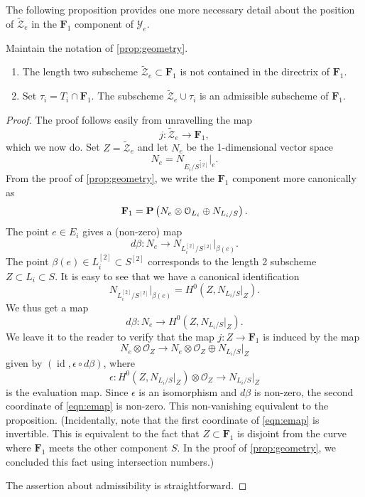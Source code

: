 \documentclass[12pt,reqno]{amsart}
\DeclareMathOperator{\id}{id}
\renewcommand{\to}{{\longrightarrow}}
\numberwithin{equation}{section}
\renewcommand{\O}{\mathcal O}
\newcommand{\F}{\mathbf F}
\newcommand{\td}{\widetilde}
\begin{document}
The following proposition provides one more necessary detail about the position of $\widetilde {\mathcal Z}_e$ in the $\F_1$ component of $\mathcal Y_e$.
\begin{proposition}
  \label{prop:nodirectrix}
  Maintain the notation of \autoref{prop:geometry}.
  \begin{enumerate}
  \item The length two
    subscheme $\td{\mathcal{Z}}_{e} \subset \F_{1}$ is not contained in the directrix of $\F_{1}$.
  \item Set $\tau_i = T_i \cap \F_1$.
    The subscheme $\td{\mathcal Z}_e \cup \tau_i$ is an admissible subscheme of $\F_1$.
  \end{enumerate}
\end{proposition}
\begin{proof}
  The proof follows easily from unravelling the map
  \[ j \colon \widetilde {\mathcal Z}_e \to \F_1,\]
  which we now do.
  Set $Z = \widetilde{\mathcal Z}_e$ and let $N_e$ be the 1-dimensional vector space
  \[ N_e = N_{E_i/\widetilde{S^{[2]}}} \big|_e. \]
  From the proof of \autoref{prop:geometry}, we write the $\F_1$ component more canonically as
  \[
    \F_1 = \P\left(N_e \otimes \O_{L_i} \oplus N_{L_i/S}\right).
  \]
  The point $e \in E_i$ gives a (non-zero) map
  \[
    d \beta \colon N_e \to N_{L^{[2]}_i / S^{[2]}}|_{\beta(e)}.
  \]
  The point $\beta(e) \in L^{[2]}_i \subset S^{[2]}$ corresponds to the length 2 subscheme $Z \subset L_i \subset S$.
  It is easy to see that we have a canonical identification
  \[
    N_{L^{[2]}_i / S^{[2]}}\big |_{\beta(e)} = H^0\left(Z, N_{L_i/S}|_Z\right).
  \]
  We thus get a map
  \[
    d \beta \colon N_e \to H^0\left(Z, N_{L_i/S}|_Z\right).
  \]
  We leave it to the reader to verify that the map $j \colon Z \to \F_1$ is induced by the map
  \begin{equation}\label{eqn:emap}
    N_e \otimes \O_Z \to N_e \otimes \O_Z \oplus N_{L_i/S}|_Z
  \end{equation}
  given by $(\id, \epsilon \circ d\beta)$, where
  \[
    \epsilon \colon H^0\left(Z, N_{L_i/S}|_Z\right) \otimes \O_Z \to N_{L_i/S}|_Z
  \]
  is the evaluation map.
  Since $\epsilon$ is an isomorphism and $d \beta$ is non-zero, the second coordinate of \eqref{eqn:emap} is non-zero.
  This non-vanishing equivalent to the proposition.
  (Incidentally, note that the first coordinate of \eqref{eqn:emap} is invertible.
  This is equivalent to the fact that $Z \subset \F_1$ is disjoint from the curve where $\F_1$ meets the other component $S$.
  In the proof of \autoref{prop:geometry}, we concluded this fact using intersection numbers.)

  The assertion about admissibility is straightforward.
\end{proof}
\end{document}
